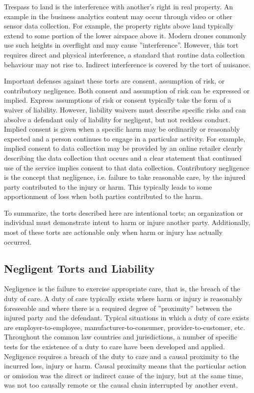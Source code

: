 Trespass to land is the interference with another's right in real property. An example in the business analytics content may occur through video or other sensor data collection. For example, the property rights above land typically extend to some portion of the lower airspace above it. Modern drones commonly use such heights in overflight and may cause ''interference''. However, this tort requires direct and physical interference, a standard that routine data collection behaviour may not rise to. Indirect interference is covered by the tort of nuisance. 

Important defenses against these torts are consent, assumption of risk, or contributory negligence. Both consent and assumption of risk can be expressed or implied. Express assumptions of risk or consent typically take the form of a waiver of liability. However, liability waivers must describe specific risks and can absolve a defendant only of liability for negligent, but not reckless conduct. Implied consent is given when a specific harm may be ordinarily or reasonably expected and a person continues to engage in a particular activity. For example, implied consent to data collection may be provided by an online retailer clearly describing the data collection that occurs and a clear statement that continued use of the service implies consent to that data collection. Contributory negligence is the concept that negligence, i.e. failure to take reasonable care, by the injured party contributed to the injury or harm. This typically leads to some apportionment of loss when both parties contributed to the harm. 

To summarize, the torts described here are intentional torts; an organization or individual must demonstrate intent to harm or injure another party. Additionally, most of these torts are actionable only when harm or injury has actually occurred. 

\subsection*{Negligent Torts and Liability}

Negligence is the failure to exercise appropriate care, that is, the breach of the duty of care. A duty of care typically exists where harm or injury is reasonably foreseeable and where there is a required degree of ''proximity'' between the injured party and the defendant. Typical situations in which a duty of care exists are employer-to-employee, manufacturer-to-consumer, provider-to-customer, etc. Throughout the common law countries and jurisdictions, a number of specific tests for the existence of a duty to care have been developed and applied. Negligence requires a breach of the duty to care and a causal proximity to the incurred loss, injury or harm. Causal proximity means that the particular action or omission was the direct or indirect cause of the injury, but at the same time, was not too causally remote or the causal chain interrupted by another event.

